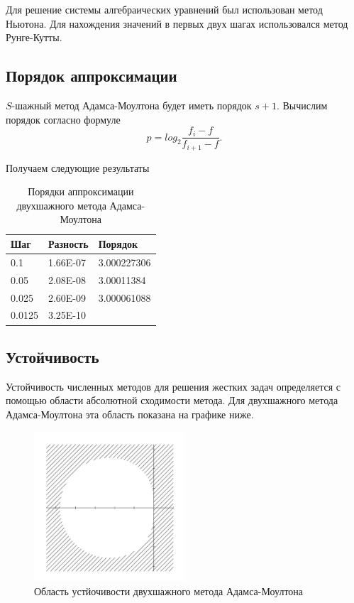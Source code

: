 \documentclass[12pt, a4paper]{article}
\begin{document}
Для решение системы алгебраических уравнений был использован метод Ньютона. Для нахождения значений в первых двух шагах использовался метод Рунге-Кутты.

\subsection{Порядок аппроксимации}

$S$-шажный метод Адамса-Моултона будет иметь порядок $s + 1$. 
Вычислим порядок согласно формуле 
\begin{equation}
	\label{approx_formula}
	p = log_2 \frac{f_i - f}{f_{i+1} - f}.
\end{equation}

Получаем следующие результаты
\begin{table}[hbt!]
	\centering
	\begin{tabular}{|l|l|l|} 
		\hline
		Шаг      & Разность     & Порядок            \\ 
		\hline
		0.1    & 1.66E-07 & 3.000227306  \\ 
		\hline
		0.05   & 2.08E-08 & 3.00011384   \\ 
		\hline
		0.025  & 2.60E-09 & 3.000061088  \\ 
		\hline
		0.0125 & 3.25E-10 &              \\
		\hline
	\end{tabular}
	\vspace*{4mm}
	\label{table-Adams-2}
	\caption{Порядки аппроксимации двухшажного метода Адамса-Моултона}
\end{table}

\newpage

\subsection{Устойчивость}

Устойчивость численных методов для решения жестких задач определяется с помощью области абсолютной сходимости метода. Для двухшажного метода Адамса-Моултона эта область показана на графике ниже.
\begin{figure}[hbt!]
	\centering
	\includegraphics[width=0.5\textwidth]{lin-stab-a-m-2}%
	\caption{Область устйочивости двухшажного метода Адамса-Моултона}
	\vspace*{-2mm}
	\label{lin-stab-a-m-2}
\end{figure}
\end{document}

